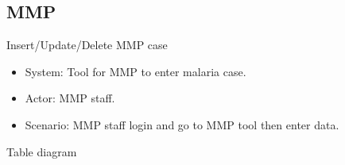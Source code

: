 \documentclass[letterpaper,10pt,english,openany,oneside]{sphinxmanual}
\begin{document}
\subsection{MMP}
\label{\detokenize{module/module:mmp}}
\sphinxAtStartPar
Insert/Update/Delete MMP case
\begin{itemize}
\item {} 
\sphinxAtStartPar
System: Tool for MMP to enter malaria case.

\item {} 
\sphinxAtStartPar
Actor: MMP staff.

\item {} 
\sphinxAtStartPar
Scenario: MMP staff login and go to MMP tool then enter data.

\end{itemize}

\sphinxAtStartPar
Table diagram
\end{document}
